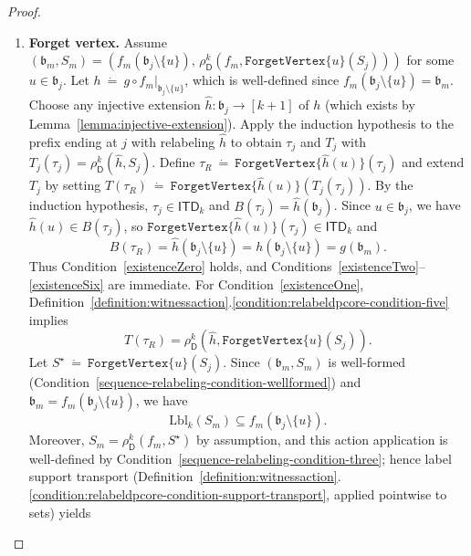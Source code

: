 \documentclass[11pt,a4paper]{article}
\newcommand{\treewidthvalue}{k}
\newcommand{\abag}{\mathfrak{b}}
\newcommand{\forgetvertextype}[1]{\mathtt{ForgetVertex}\{#1\}}
\newcommand{\topbagname}{B}
\newcommand{\topbag}[1]{\topbagname(#1)}
\newcommand{\allabstractdecompositionstreewidth}[1]{\mathsf{ITD}_{#1}}
\newcommand{\abstractdecomposition}{\tau}
\newcommand{\defeq}{~\dot{=}~}
\newcommand{\vertexone}{u}
\newcommand{\dpcore}{\mathsf{D}}
\newcommand{\witnessset}{S}
\newcommand{\dprefutation}{R}
\newcommand{\subtermToBag}{T}
\newcommand{\relabelingfunction}{f}
\newcommand{\action}{\rho}
\begin{document}
\begin{proof}
\begin{enumerate}
\item \textbf{Forget vertex.}
Assume $(\abag_m,\witnessset_m)=(\relabelingfunction_m(\abag_j\setminus\{\vertexone\}),\,\action_{\dpcore}^{\treewidthvalue}(\relabelingfunction_m,\forgetvertextype{\vertexone}(\witnessset_j)))$ for some $\vertexone\in \abag_j$.
Let $h\defeq g\circ \relabelingfunction_m|_{\abag_j\setminus\{\vertexone\}}$, which is well-defined since $\relabelingfunction_m(\abag_j\setminus\{\vertexone\})=\abag_m$.
Choose any injective extension $\hat h:\abag_j\to[\treewidthvalue+1]$ of $h$ (which exists by Lemma~\ref{lemma:injective-extension}).
Apply the induction hypothesis to the prefix ending at $j$ with relabeling $\hat h$ to obtain $\abstractdecomposition_j$ and $\subtermToBag_j$ with $\subtermToBag_j(\abstractdecomposition_j)=\action_{\dpcore}^{\treewidthvalue}(\hat h,\witnessset_j)$.
Define $\abstractdecomposition_{\dprefutation}\defeq \forgetvertextype{\hat h(\vertexone)}(\abstractdecomposition_j)$ and extend $\subtermToBag_j$ by setting $\subtermToBag(\abstractdecomposition_{\dprefutation})\defeq \forgetvertextype{\hat h(\vertexone)}(\subtermToBag_j(\abstractdecomposition_j))$.
By the induction hypothesis, $\abstractdecomposition_j\in \allabstractdecompositionstreewidth{\treewidthvalue}$ and $\topbag{\abstractdecomposition_j}=\hat h(\abag_j)$.
Since $\vertexone\in \abag_j$, we have $\hat h(\vertexone)\in \topbag{\abstractdecomposition_j}$, so $\forgetvertextype{\hat h(\vertexone)}(\abstractdecomposition_j)\in \allabstractdecompositionstreewidth{\treewidthvalue}$ and
\[
\topbag{\abstractdecomposition_{\dprefutation}}
= \hat h(\abag_j\setminus\{\vertexone\})
= h(\abag_j\setminus\{\vertexone\})
= g(\abag_m).
\]
Thus Condition~\ref{existenceZero} holds, and Conditions~\ref{existenceTwo}--\ref{existenceSix} are immediate.
For Condition~\ref{existenceOne}, Definition~\ref{definition:witnessaction}.\ref{condition:relabeldpcore-condition-five} implies
\[
	\subtermToBag(\abstractdecomposition_{\dprefutation})
	= \action_{\dpcore}^{\treewidthvalue}(\hat h,\forgetvertextype{\vertexone}(\witnessset_j)).
	\]
	Let $S^\star\defeq \forgetvertextype{\vertexone}(\witnessset_j)$.
	Since $(\abag_m,\witnessset_m)$ is well-formed (Condition~\ref{sequence-relabeling-condition-wellformed}) and $\abag_m=\relabelingfunction_m(\abag_j\setminus\{\vertexone\})$, we have
	\[
	\mathrm{Lbl}_{\treewidthvalue}(\witnessset_m)\subseteq \relabelingfunction_m(\abag_j\setminus\{\vertexone\}).
	\]
	Moreover, $\witnessset_m=\action_{\dpcore}^{\treewidthvalue}(\relabelingfunction_m,S^\star)$ by assumption, and this action application is well-defined by Condition~\ref{sequence-relabeling-condition-three}; hence label support transport (Definition~\ref{definition:witnessaction}.\ref{condition:relabeldpcore-condition-support-transport}, applied pointwise to sets) yields

\end{enumerate}
\end{proof}
\end{document}
